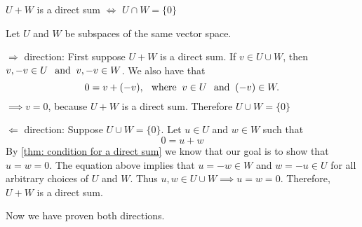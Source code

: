 \setcounter{thm}{45}
\begin{thm} 
  \label{thm: intersection of direct sum of two subscpaces}
  $U+W$ is a direct sum $\iff$ $U \cap W = \{0\}$
\end{thm}
\begin{prf} Let $U$ and $W$ be subspaces of the same vector space.
  \begin{description}
    \item{$\Rightarrow$ direction:} First suppose $U+W$ is a direct sum. If $v \in U \cup W$, then $v, -v \in U \;\;\, \text{and}\;\; v, -v \in W$. We also have that
    \begin{equation}
      0 = v + (-v), \;\;\, \text{where}\;\; v\in U \;\;\, \text{and}\;\; (-v) \in W.
    \end{equation}
    $\implies v=0$, because $U+W$  is a direct sum. Therefore $U \cup W = \{0\}$ 
    
    \item{$\Leftarrow$ direction:} Suppose $U\cup W = \{0\}$. Let  $u\in U$ and $w \in W$ such that
    \begin{equation}
      0 = u+w
    \end{equation}
    By \ref{thm: condition for a direct sum} we know that our goal is to show that $u=w=0$. The equation above implies that $u=-w\in W$  and $w=-u \in U$ for all arbitrary choices of $U$ and $W$. Thus $u,w \in U\cup W \implies u=w=0.$ Therefore, $U+W$ is a direct sum.
  \end{description}
  Now we have proven both directions.
\end{prf}
